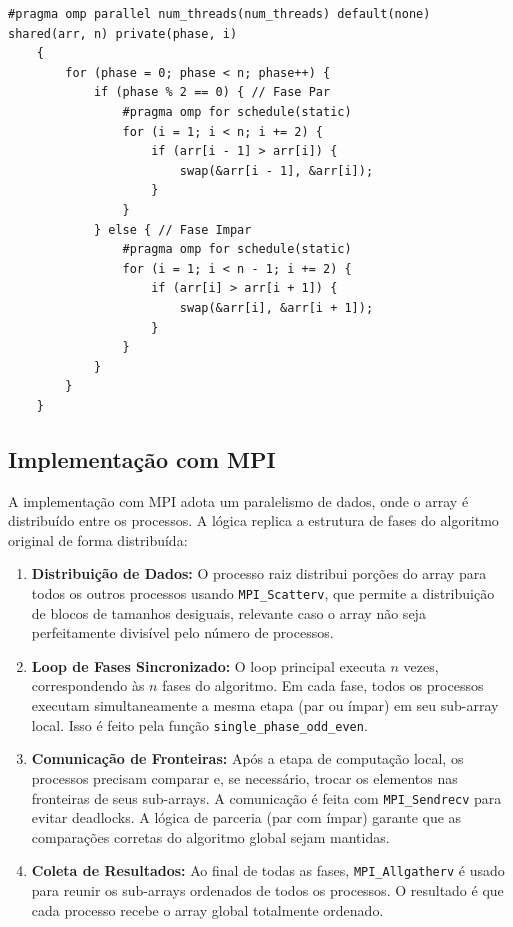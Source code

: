 \documentclass[12pt, a4paper]{article}
\begin{document}
\begin{lstlisting}[caption={Paralelização de uma fase com OpenMP.}, label=lst:openmp]
#pragma omp parallel num_threads(num_threads) default(none) shared(arr, n) private(phase, i)
    {
        for (phase = 0; phase < n; phase++) {
            if (phase % 2 == 0) { // Fase Par
                #pragma omp for schedule(static)
                for (i = 1; i < n; i += 2) {
                    if (arr[i - 1] > arr[i]) {
                        swap(&arr[i - 1], &arr[i]);
                    }
                }
            } else { // Fase Impar
                #pragma omp for schedule(static)
                for (i = 1; i < n - 1; i += 2) {
                    if (arr[i] > arr[i + 1]) {
                        swap(&arr[i], &arr[i + 1]);
                    }
                }
            }
        }
    }
\end{lstlisting}

\subsection{Implementação com MPI}
A implementação com MPI adota um paralelismo de dados, onde o array é distribuído entre os processos. A lógica replica a estrutura de fases do algoritmo original de forma distribuída:
\begin{enumerate}
    \item \textbf{Distribuição de Dados:} O processo raiz distribui porções do array para todos os outros processos usando \texttt{MPI\_Scatterv}, que permite a distribuição de blocos de tamanhos desiguais, relevante caso o array não seja perfeitamente divisível pelo número de processos.
    \item \textbf{Loop de Fases Sincronizado:} O loop principal executa $n$ vezes, correspondendo às $n$ fases do algoritmo. Em cada fase, todos os processos executam simultaneamente a mesma etapa (par ou ímpar) em seu sub-array local. Isso é feito pela função \texttt{single\_phase\_odd\_even}.
    \item \textbf{Comunicação de Fronteiras:} Após a etapa de computação local, os processos precisam comparar e, se necessário, trocar os elementos nas fronteiras de seus sub-arrays. A comunicação é feita com \texttt{MPI\_Sendrecv} para evitar deadlocks. A lógica de parceria (par com ímpar) garante que as comparações corretas do algoritmo global sejam mantidas.
    \item \textbf{Coleta de Resultados:} Ao final de todas as fases, \texttt{MPI\_Allgatherv} é usado para reunir os sub-arrays ordenados de todos os processos. O resultado é que cada processo recebe o array global totalmente ordenado.
\end{enumerate}
\end{document}
